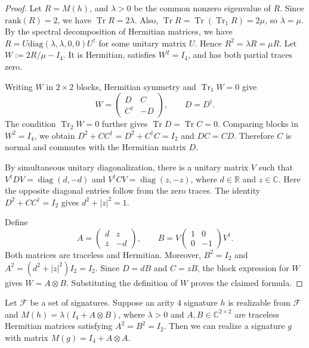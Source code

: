 \begin{proof}
Let $R=M(h)$, and $\lambda>0$ be the common nonzero eigenvalue of $R$.
Since $\mathrm{rank}(R)=2$, we have $\operatorname{Tr}R=2\lambda$.
Also,
$\operatorname{Tr}R=\operatorname{Tr}(\operatorname{Tr}_1R)=2\mu$,
so $\lambda=\mu$.
By the spectral decomposition of Hermitian matrices, we have $R=U\mathrm{diag}(\lambda,\lambda,0,0)U^{\dagger}$ for some unitary matrix $U$.
Hence $R^2=\lambda R=\mu R$.
Let $W:=2R/\mu-I_4$.
It is Hermitian, satisfies $W^2=I_4$,
and has both partial traces zero.

Writing $W$ in $2\times2$ blocks, Hermitian symmetry and
$\operatorname{Tr}_1W=0$ give
\[
  W=\begin{pmatrix}
      D&C\\
      C^\dagger&-D
    \end{pmatrix},
  \qquad D=D^\dagger.
\]
The condition $\operatorname{Tr}_2W=0$ further gives
$\operatorname{Tr}D=\operatorname{Tr}C=0$.
Comparing blocks in $W^2=I_4$, we obtain
$D^2+CC^\dagger=D^2+C^\dagger C=I_2$ and $DC=CD$.
Therefore $C$ is normal and commutes with the Hermitian matrix $D$.

By simultaneous unitary diagonalization, there is a unitary matrix
$V$ such that
$V^\dagger DV=\operatorname{diag}(d,-d)$ and
$V^\dagger CV=\operatorname{diag}(z,-z)$,
where $d\in\mathbb R$ and $z\in\mathbb C$.
Here the opposite diagonal entries follow from the zero traces.
The identity $D^2+CC^\dagger=I_2$ gives $d^2+|z|^2=1$.

Define
\[
  A=\begin{pmatrix}d&z\\\overline z&-d\end{pmatrix},
  \qquad
  B=V\begin{pmatrix}1&0\\0&-1\end{pmatrix}V^\dagger.
\]
Both matrices are traceless and Hermitian.
Moreover, $B^2=I_2$ and
$A^2=(d^2+|z|^2)I_2=I_2$.
Since $D=dB$ and $C=zB$, the block expression for $W$
gives $W=A\otimes B$.
Substituting the definition of $W$ proves the claimed formula.
\end{proof}

\begin{lemma}\label{lm:realize-I-plus-AA}
Let $\mathcal F$ be a set of signatures. 
Suppose an arity 4 signature $h$ is realizable from $\mathcal F$ and
$M(h)=\lambda(I_4+A\otimes B)$, where $\lambda>0$
and $A,B\in\mathbb C^{2\times2}$ are traceless Hermitian matrices
satisfying $A^2=B^2=I_2$.
Then we can realize a signature $g$ with matrix
$M(g)=I_4+A\otimes A$.
\end{lemma}

